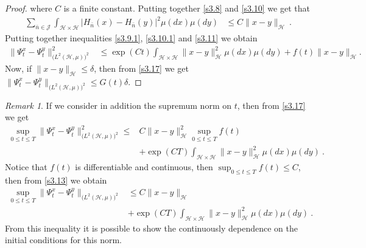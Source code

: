 \documentclass[]{interact}
\theoremstyle{plain}%
\theoremstyle{definition}
\theoremstyle{remark}
\newtheorem{remark}{Remark}
\begin{document}
\begin{proof}
        where $C$ is a finite constant. Putting together \eqref{s3.8} and
        \eqref{s3.10} we get that
        \begin{align}
            \sum_{\bar n\in \mathcal{J}} \int_{\mathcal{H}\times \mathcal{H}}  
            \big|
            H_{\bar n}(x) -H_{\bar n}(y) \big|^2 \mu(dx)\mu(dy) &\le
            C \| x-y\|_{\mathcal{H}} \ .
            \label{s3.11}
        \end{align}
        Putting together inequalities \eqref{s3.9.1}, \eqref{s3.10.1} and
        \eqref{s3.11} we obtain
        \begin{align}
          \| \Psi_t^x-\Psi_t^y\|_{\big(L^2(\mathcal{H},\mu) \big)^2}^2&\le   
          \exp(Ct)
          \int_{\mathcal{H}\times \mathcal{H}}
          \| x-y\|_{\mathcal{H}}^2 \mu(dx)\mu(dy) +  f(t)\| x-y\|_{\mathcal{H}}.
          \label{s3.17}
        \end{align}
        Now, if $\| x-y\|_{\mathcal{H}}\le \delta $, then from \eqref{s3.17} we 
        get
        $
             \| 
                \Psi_t^x - \Psi_t^y
             \|_{\big( L^2(\mathcal{H}, \mu) \big)^2} 
             \le
                G(t) \delta
        $.
    \end{proof}
%
    \begin{remark}
        If we consider in addition the supremum norm on $t$, then from
        \eqref{s3.17} we get
        \begin{equation}
            \label{s3.13}
            \begin{aligned}
                \sup_{0\le t\le T}\| \Psi_t^x-\Psi_t^y\|_{
                    \big(L^2(\mathcal{H},\mu) \big)^2} ^ 2
                    \le&
                     C \| x-y\|_{\mathcal{H}}^2
                     \sup_{0\le t\le T} f(t)
                     \\
                     &+
                    \exp(CT)
                    \int_{\mathcal{H}\times \mathcal{H}}
                    \|x-y\|_{\mathcal{H}}^2 \mu(dx)\mu(dy) \ .
            \end{aligned}
        \end{equation}
        Notice that $f(t)$ is differentiable and continuous, then
        $\sup_{0\le t\le T} f(t)\le C$, then from \eqref{s3.13} we obtain
        \begin{equation}
            \label{s3.14}
            \begin{aligned}
                \sup_{0\le t\le T}
                \|
                    \Psi_t^x-\Psi_t^y
                \|_{\big(L^2(\mathcal{H},\mu)\big)^2}
                &\le
                C \| x-y\|_{\mathcal{H}}
                \\
                & +
                \exp(CT)
                \int_{\mathcal{H}\times \mathcal{H}}
                \| x-y\|_{\mathcal{H}}^2 \mu(dx)\mu(dy) \ .
            \end{aligned}
        \end{equation}
        From this inequality it is possible to show the continuously dependence 
        on the initial conditions for this norm.
    \end{remark}
\end{document}
